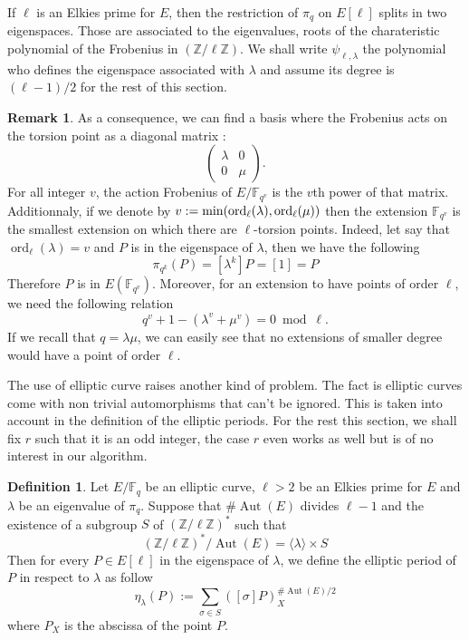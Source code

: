 \documentclass[12pt]{article}
\theoremstyle{plain}
\theoremstyle{definition}
\newtheorem{definition}[theorem]{Definition}
\newtheorem*{remark}{Remark}
\DeclareMathOperator{\order}{ord} %
\DeclareMathOperator{\Aut}{Aut}
\def\Z{\ensuremath{\mathbb{Z}}}
\def\F{\ensuremath{\mathbb{F}}}
\newcounter{algorithm}
\begin{document}
If $\ell$ is an Elkies prime for $E$, then the restriction of $\pi_q$ on
$E[\ell]$ splits in two eigenspaces. Those are associated to the eigenvalues,
roots of the charateristic polynomial of the Frobenius in $(\Z/\ell\Z)$. 
We shall write $\psi_{\ell,\lambda}$ the polynomial who defines the eigenspace 
associated with $\lambda$ and assume its degree is $(\ell - 1)/2$ for the rest
of this section. 

\begin{remark}
As a consequence, we can find a basis where the Frobenius acts on the torsion 
point as a diagonal matrix :
\begin{equation}
\begin{pmatrix}
\lambda & 0\\
0 & \mu
\end{pmatrix}.
\end{equation}
For all integer $v$, the action Frobenius of $E/\F_{q^v}$ is the $v$th
power of that matrix. Additionnaly, if we denote by $v :=
\textup{min}(\order_\ell(\lambda),\order_\ell(\mu))$ then the extension $\F_{q^v}$ is
the smallest extension on which there are $\ell$-torsion points. Indeed, let 
say that $\order_\ell(\lambda) = v$ and $P$ is in the eigenspace of $\lambda$, 
then we have the following
\begin{equation}
\pi_{q^k}(P)=[\lambda^k]P=[1]=P
\end{equation}
Therefore $P$ is in $E(\F_{q^v})$. Moreover, for an extension to have points of
order $\ell$, we need the following relation
\begin{equation}
q^v + 1 - (\lambda^v + \mu^v) = 0 \bmod \ell.
\end{equation}
If we recall that $q=\lambda\mu$, we can easily see that no extensions of
smaller degree would have a point of order $\ell$.
\end{remark}

The use of elliptic curve raises another kind of problem. The fact is elliptic 
curves come with non trivial automorphisms that can't be ignored. This is 
taken into account in the definition of the elliptic periods. For the rest this
section, we shall fix $r$ such that it is an odd integer, the case $r$ even
works as well but is of no interest in our algorithm.

\begin{definition}
\label{definition:ellperiod}
Let $E/\F_q$ be an elliptic curve, $\ell>2$ be an Elkies prime for $E$ and 
$\lambda$ be an eigenvalue of $\pi_q$. Suppose that $\#\Aut(E)$ divides $\ell -
1$ and the existence of a subgroup $S$ of $(\Z/\ell\Z)^{\ast}$ such that 
\begin{equation}
(\Z/\ell\Z)^{\ast}/\Aut(E)=\langle{\lambda}\rangle\times S
\end{equation}
Then for every $P\in E[\ell]$ in the eigenspace of $\lambda$, we define the
elliptic period of $P$ in respect to $\lambda$ as follow
\begin{equation}
\eta_{\lambda}(P) := \sum_{\sigma\in S}{\left([\sigma]P\right)_X^{\#\Aut(E)/2}}
\end{equation}
where $P_X$ is the abscissa of the point $P$.

\end{definition}
\end{document}
